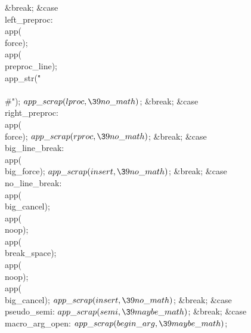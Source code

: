 \&{break};\6
\4\&{case} \\{left\_preproc}:\5
\\{app}(\\{force});\5
\\{app}(\\{preproc\_line});\5
\\{app\_str}(\.{"\\\\\#"});\6
${}\\{app\_scrap}(\\{lproc},\39\\{no\_math}){}$;\5
\&{break};\6
\4\&{case} \\{right\_preproc}:\5
\\{app}(\\{force});\5
${}\\{app\_scrap}(\\{rproc},\39\\{no\_math}){}$;\5
\&{break};\6
\4\&{case} \\{big\_line\_break}:\5
\\{app}(\\{big\_force});\5
${}\\{app\_scrap}(\\{insert},\39\\{no\_math}){}$;\5
\&{break};\6
\4\&{case} \\{no\_line\_break}:\5
\\{app}(\\{big\_cancel});\5
\\{app}(\\{noop});\5
\\{app}(\\{break\_space});\5
\\{app}(\\{noop});\5
\\{app}(\\{big\_cancel});\6
${}\\{app\_scrap}(\\{insert},\39\\{no\_math}){}$;\5
\&{break};\6
\4\&{case} \\{pseudo\_semi}:\5
${}\\{app\_scrap}(\\{semi},\39\\{maybe\_math}){}$;\5
\&{break};\6
\4\&{case} \\{macro\_arg\_open}:\5
${}\\{app\_scrap}(\\{begin\_arg},\39\\{maybe\_math}){}$;\5
